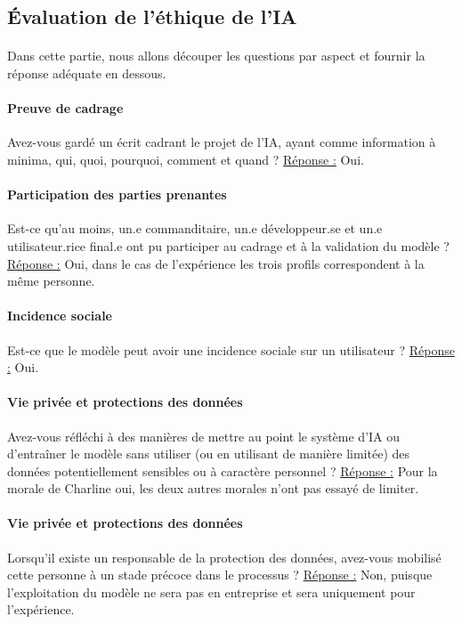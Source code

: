 \documentclass[10pt, french, a4paper]{report}
\begin{document}
\subsection{\uppercase{é}valuation de l'éthique de l'IA}

\paragraph{}
Dans cette partie, nous allons découper les questions par aspect et fournir la réponse adéquate en dessous.

\paragraph{Preuve de cadrage} 
Avez-vous gardé un écrit cadrant le projet de l'IA, ayant comme information à minima, qui, quoi, pourquoi, comment et quand ?
\newline
\underline{Réponse :} Oui.

\paragraph{Participation des parties prenantes} 
Est-ce qu'au moins, un.e commanditaire, un.e développeur.se et un.e utilisateur.rice final.e ont pu participer au cadrage et à la validation du modèle ?
\newline
\underline{Réponse :} Oui, dans le cas de l'expérience les trois profils correspondent à la même personne.

\paragraph{Incidence sociale} 
Est-ce que le modèle peut avoir une incidence sociale sur un utilisateur ?
\newline
\underline{Réponse :} Oui.

\paragraph{Vie privée et protections des données} 
Avez-vous réfléchi à des manières de mettre au point le système d'IA ou d'entraîner le modèle sans utiliser (ou en utilisant de manière limitée) des données potentiellement sensibles ou à caractère personnel ?
\newline
\underline{Réponse :} Pour la morale de Charline oui, les deux autres morales n'ont pas essayé de limiter.

\paragraph{Vie privée et protections des données} 
Lorsqu'il existe un responsable de la protection des données, avez-vous mobilisé cette personne à un stade précoce dans le processus ?
\newline
\underline{Réponse :} Non, puisque l'exploitation du modèle ne sera pas en entreprise et sera uniquement pour l'expérience. 
\end{document}

